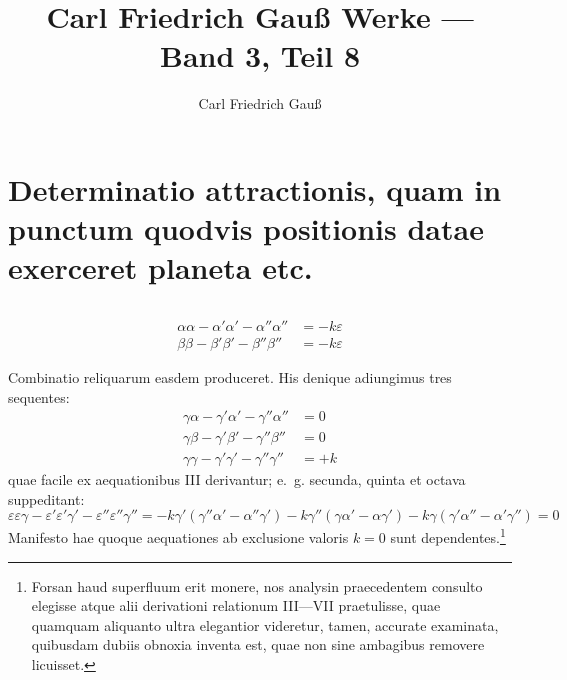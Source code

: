 \documentclass[12pt,a4paper]{article}
\title{Carl Friedrich Gauß Werke --- Band 3, Teil 8}
\author{Carl Friedrich Gauß}
\date{}
\begin{document}
\maketitle
\thispagestyle{fancy}

\tableofcontents
\newpage

\section*{Determinatio attractionis, quam in punctum quodvis positionis datae exerceret planeta etc.}

\setcounter{subsection}{2}
\subsection{}

\begin{equation}
\tag{VI}
\begin{aligned}
\alpha\alpha - \alpha'\alpha' - \alpha''\alpha'' &= -k\varepsilon \\
\beta\beta - \beta'\beta' - \beta''\beta'' &= -k\varepsilon
\end{aligned}
\end{equation}

Combinatio reliquarum easdem produceret. His denique adiungimus tres sequentes:
\begin{equation}
\tag{VII}
\begin{aligned}
\gamma\alpha - \gamma'\alpha' - \gamma''\alpha'' &= 0 \\
\gamma\beta - \gamma'\beta' - \gamma''\beta'' &= 0 \\
\gamma\gamma - \gamma'\gamma' - \gamma''\gamma'' &= +k
\end{aligned}
\end{equation}
quae facile ex aequationibus III derivantur; e.~g. secunda, quinta et octava suppeditant:
\[
\varepsilon\varepsilon\gamma - \varepsilon'\varepsilon'\gamma' - \varepsilon''\varepsilon''\gamma''
= -k\gamma'(\gamma''\alpha' - \alpha''\gamma') - k\gamma''(\gamma\alpha' - \alpha\gamma')
- k\gamma(\gamma'\alpha'' - \alpha'\gamma'') = 0
\]
Manifesto hae quoque aequationes ab exclusione valoris $k=0$ sunt dependentes.\footnote{Forsan haud superfluum erit monere, nos analysin praecedentem consulto elegisse atque alii derivationi relationum III---VII praetulisse, quae quamquam aliquanto ultra elegantior videretur, tamen, accurate examinata, quibusdam dubiis obnoxia inventa est, quae non sine ambagibus removere licuisset.}
\end{document}

